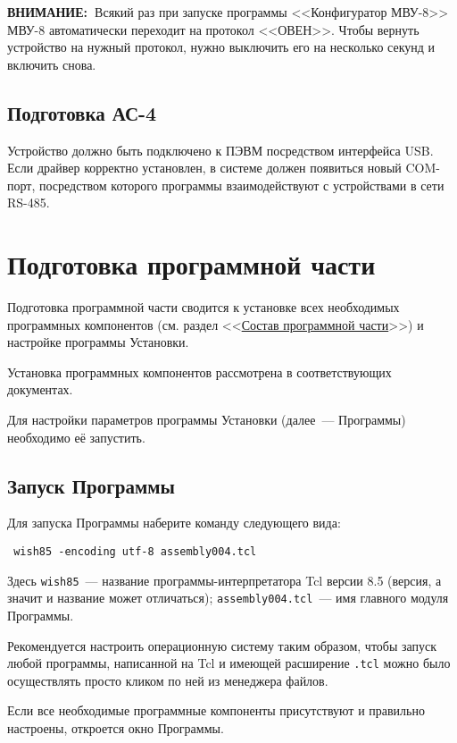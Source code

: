 \documentclass[12pt, a4paper, twocolumn]{report}
\newcommand{\IMPORTANT}{

{\bf ВНИМАНИЕ:~}}
\begin{document}
\IMPORTANT Всякий раз при запуске программы <<Конфигуратор МВУ-8>> МВУ-8 автоматически переходит на протокол <<ОВЕН>>. Чтобы вернуть устройство на нужный протокол, нужно выключить его на несколько секунд и включить снова.

\subsection{Подготовка АС-4}

Устройство должно быть подключено к ПЭВМ посредством интерфейса USB. Если драйвер корректно установлен, в системе должен появиться новый COM-порт, посредством которого программы взаимодействуют с устройствами в сети RS-485.

\section{Подготовка программной части}

Подготовка программной части сводится к установке всех необходимых программных компонентов (см. раздел <<\hyperref[sec_software]{Состав программной части}>>) и настройке программы Установки.

Установка программных компонентов рассмотрена в соответствующих документах.

Для настройки параметров программы Установки (далее~--- Программы) необходимо её запустить.

\subsection{Запуск Программы}

Для запуска Программы наберите команду следующего вида:

{\small
\begin{verbatim}
 wish85 -encoding utf-8 assembly004.tcl
\end{verbatim}
}

Здесь {\tt wish85}~--- название программы-интерпретатора Tcl версии 8.5 (версия, а значит и название может отличаться); {\tt assembly004.tcl}~--- имя главного модуля Программы.

Рекомендуется настроить операционную систему таким образом, чтобы запуск любой программы, написанной на Tcl и имеющей расширение {\tt .tcl} можно было осуществлять просто кликом по ней из менеджера файлов.

Если все необходимые программные компоненты присутствуют и правильно настроены, откроется окно Программы.
\end{document}
